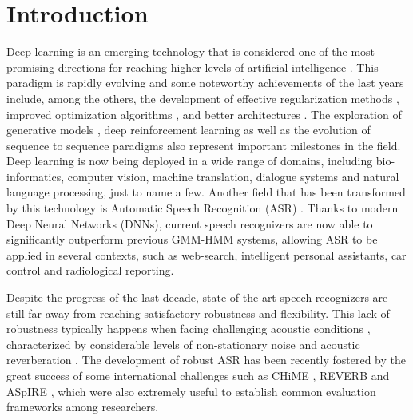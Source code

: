 \documentclass[journal]{IEEEtran}
\begin{document}
\section{Introduction}
Deep learning is an emerging technology that is considered one of the most promising directions for reaching higher levels of artificial intelligence \cite{Goodfellow-et-al-2016-Book}. 
This paradigm is rapidly evolving and some noteworthy achievements of the last years include, among the others, the development of effective regularization methods \cite{dropout,batchnorm}, improved optimization algorithms \cite{adam}, and  better architectures \cite{cnn1,tdnn2,lstm_highway,gru1}. The exploration of generative models \cite{gan}, deep reinforcement learning \cite{alpha_go} as well as the evolution of sequence to sequence paradigms \cite{dima_nmt} also represent important milestones in the field. Deep learning is now being deployed in a wide range of domains, including bio-informatics, computer vision, machine translation, dialogue systems and natural language processing, just to name a few.
Another field that has been transformed by this technology is Automatic Speech Recognition (ASR) \cite{lideng}.  Thanks to modern Deep Neural Networks (DNNs), current speech recognizers are now able to significantly outperform previous GMM-HMM systems, allowing ASR to be applied in several contexts, such as web-search, intelligent personal assistants, car control and radiological reporting.

Despite the progress of the last decade, state-of-the-art speech recognizers are still far away from reaching satisfactory robustness and flexibility. This lack of robustness typically happens  when facing challenging acoustic conditions \cite{adverse}, characterized by considerable levels of non-stationary noise and acoustic reverberation \cite{dsr_summary,pawel2,hain,dnn_rev,dnn_rev2,dnn3,ravanelli_SLT,ravanelli15,ravanelli_icassp}. 
The development of robust ASR has been recently fostered by the great success of some international challenges such as CHiME \cite{chime3}, REVERB \cite{revch_short} and ASpIRE \cite{aspire}, which were also extremely useful to establish common evaluation frameworks among researchers.

\end{document}

